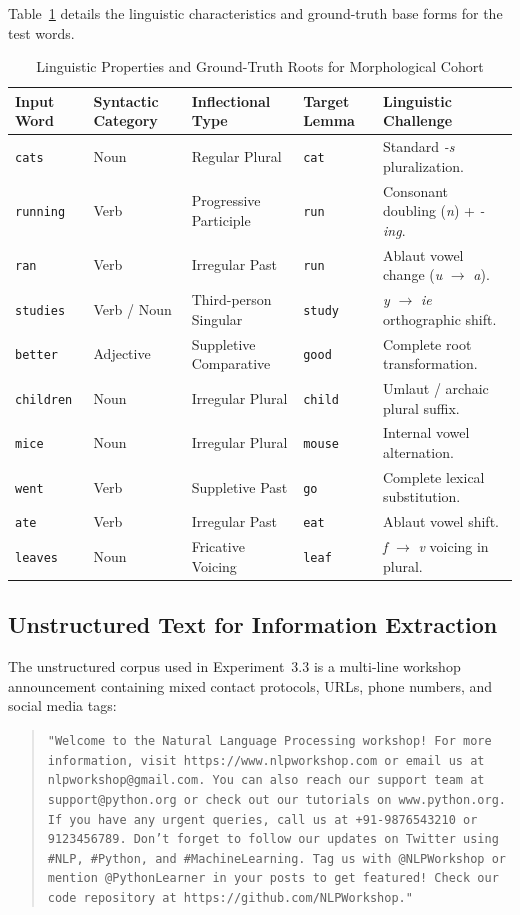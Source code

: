 \documentclass[12pt,a4paper]{report}
\begin{document}
Table~\ref{tab:exp3_morph_lexicon} details the linguistic characteristics and ground-truth base forms for the test words.
\begin{table}[H]
\centering
\small
\caption{Linguistic Properties and Ground-Truth Roots for Morphological Cohort}
\label{tab:exp3_morph_lexicon}
\begin{tabularx}{\textwidth}{llllX}
\toprule
\textbf{Input Word} & \textbf{Syntactic Category} & \textbf{Inflectional Type} & \textbf{Target Lemma} & \textbf{Linguistic Challenge} \\
\midrule
\texttt{cats} & Noun & Regular Plural & \texttt{cat} & Standard \textit{-s} pluralization. \\
\texttt{running} & Verb & Progressive Participle & \texttt{run} & Consonant doubling (\textit{n}) + \textit{-ing}. \\
\texttt{ran} & Verb & Irregular Past & \texttt{run} & Ablaut vowel change (\textit{u} $\to$ \textit{a}). \\
\texttt{studies} & Verb / Noun & Third-person Singular & \texttt{study} & \textit{y} $\to$ \textit{ie} orthographic shift. \\
\texttt{better} & Adjective & Suppletive Comparative & \texttt{good} & Complete root transformation. \\
\texttt{children} & Noun & Irregular Plural & \texttt{child} & Umlaut / archaic plural suffix. \\
\texttt{mice} & Noun & Irregular Plural & \texttt{mouse} & Internal vowel alternation. \\
\texttt{went} & Verb & Suppletive Past & \texttt{go} & Complete lexical substitution. \\
\texttt{ate} & Verb & Irregular Past & \texttt{eat} & Ablaut vowel shift. \\
\texttt{leaves} & Noun & Fricative Voicing & \texttt{leaf} & \textit{f} $\to$ \textit{v} voicing in plural. \\
\bottomrule
\end{tabularx}
\end{table}

\subsection{Unstructured Text for Information Extraction}
The unstructured corpus used in Experiment~3.3 is a multi-line workshop announcement containing mixed contact protocols, URLs, phone numbers, and social media tags:
\begin{quote}
\small
\texttt{"Welcome to the Natural Language Processing workshop! For more information, visit https://www.nlpworkshop.com or email us at nlpworkshop@gmail.com. You can also reach our support team at support@python.org or check out our tutorials on www.python.org. If you have any urgent queries, call us at +91-9876543210 or 9123456789. Don't forget to follow our updates on Twitter using \#NLP, \#Python, and \#MachineLearning. Tag us with @NLPWorkshop or mention @PythonLearner in your posts to get featured! Check our code repository at https://github.com/NLPWorkshop."}
\end{quote}
\end{document}

